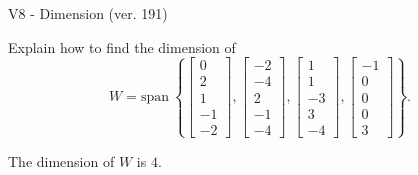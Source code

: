 \begin{exercise}
  \begin{exerciseTitle}V8 - Dimension (ver. 191)\end{exerciseTitle}
  \begin{exerciseStatement}
    Explain how to find the dimension of 
\[W=\mathrm{span}\ \left\{\left[\begin{array}{r}
0 \\
2 \\
1 \\
-1 \\
-2
\end{array}\right] , \left[\begin{array}{r}
-2 \\
-4 \\
2 \\
-1 \\
-4
\end{array}\right] , \left[\begin{array}{r}
1 \\
1 \\
-3 \\
3 \\
-4
\end{array}\right] , \left[\begin{array}{r}
-1 \\
0 \\
0 \\
0 \\
3
\end{array}\right]\right\}.\]



  \end{exerciseStatement}
  \begin{exerciseAnswer}
   The dimension of \(W\) is  \(4\).
  


  \end{exerciseAnswer}
\end{exercise}